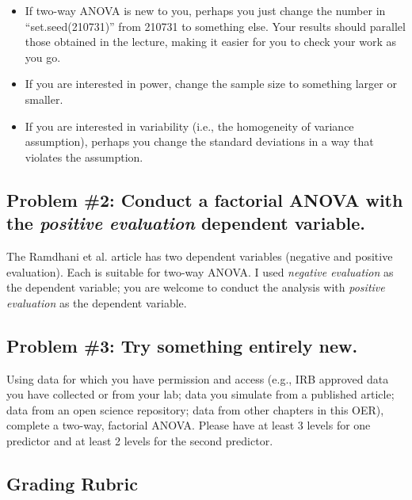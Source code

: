 \documentclass[
  11pt,
]{book}
\providecommand{\tightlist}{%
  \setlength{\itemsep}{0pt}\setlength{\parskip}{0pt}}
\begin{document}
\begin{itemize}
\tightlist
\item
  If two-way ANOVA is new to you, perhaps you just change the number in ``set.seed(210731)'' from 210731 to something else. Your results should parallel those obtained in the lecture, making it easier for you to check your work as you go.
\item
  If you are interested in power, change the sample size to something larger or smaller.
\item
  If you are interested in variability (i.e., the homogeneity of variance assumption), perhaps you change the standard deviations in a way that violates the assumption.
\end{itemize}

\hypertarget{problem-2-conduct-a-factorial-anova-with-the-positive-evaluation-dependent-variable.}{%
\subsection{\texorpdfstring{Problem \#2: Conduct a factorial ANOVA with the \emph{positive evaluation} dependent variable.}{Problem \#2: Conduct a factorial ANOVA with the positive evaluation dependent variable.}}\label{problem-2-conduct-a-factorial-anova-with-the-positive-evaluation-dependent-variable.}}

The Ramdhani et al. \citeyearpar{ramdhani_affective_2018} article has two dependent variables (negative and positive evaluation). Each is suitable for two-way ANOVA. I used \emph{negative evaluation} as the dependent variable; you are welcome to conduct the analysis with \emph{positive evaluation} as the dependent variable.

\hypertarget{problem-3-try-something-entirely-new.-1}{%
\subsection{Problem \#3: Try something entirely new.}\label{problem-3-try-something-entirely-new.-1}}

Using data for which you have permission and access (e.g., IRB approved data you have collected or from your lab; data you simulate from a published article; data from an open science repository; data from other chapters in this OER), complete a two-way, factorial ANOVA. Please have at least 3 levels for one predictor and at least 2 levels for the second predictor.

\hypertarget{grading-rubric-2}{%
\subsection{Grading Rubric}\label{grading-rubric-2}}
\end{document}
